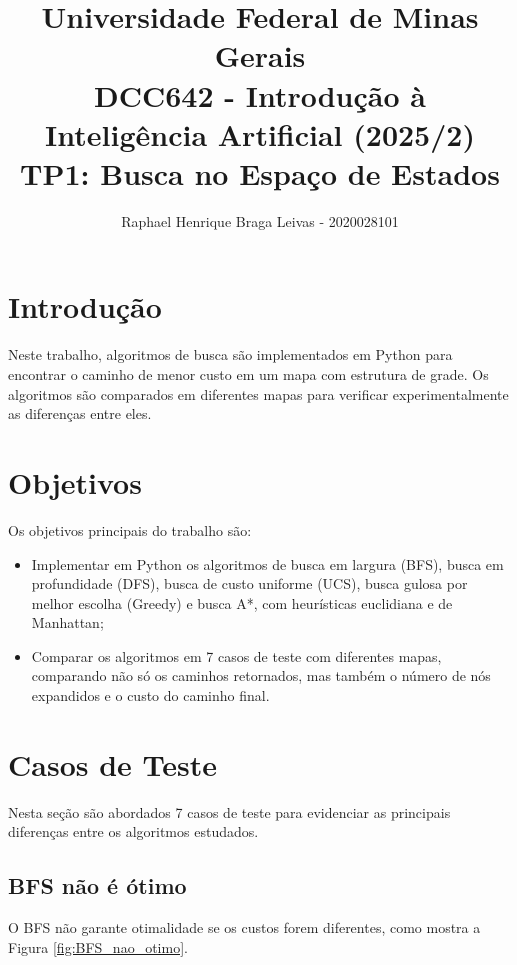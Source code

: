 \documentclass[letterpaper]{article} %
\title{Universidade Federal de Minas Gerais \\[10pt]
DCC642 - Introdução à Inteligência Artificial (2025/2) \\
 TP1: Busca no Espaço de Estados}
\author {
    Raphael Henrique Braga Leivas - 2020028101
}
\begin{document}
\maketitle


\section{Introdução}

Neste trabalho, algoritmos de busca são implementados em Python para encontrar o caminho 
de menor custo em um mapa com estrutura de grade. Os algoritmos são comparados em diferentes mapas 
para verificar experimentalmente as diferenças entre eles.

\section{Objetivos}

Os objetivos principais do trabalho são: 

\begin{itemize}
	\item Implementar em Python os algoritmos de busca em largura (BFS),
	busca em profundidade (DFS), busca de custo uniforme (UCS), busca gulosa 
	por melhor escolha (Greedy) e busca A*, com heurísticas euclidiana e de Manhattan;
	\item Comparar os algoritmos em 7 casos de teste com diferentes mapas, comparando 
	não só os caminhos retornados, mas também o número de nós expandidos e o custo do 
	caminho final.
\end{itemize}

\section{Casos de Teste}

Nesta seção são abordados 7 casos de teste para evidenciar as principais 
diferenças entre os algoritmos estudados.


\subsection{BFS não é ótimo}

O BFS não garante otimalidade se os custos forem diferentes, como 
mostra a Figura \ref{fig:BFS_nao_otimo}.
\end{document}
